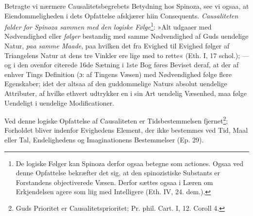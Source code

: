\documentclass[12pt,a4paper]{book}
\begin{document}
Betragte vi nærmere Causalitetsbegrebets Betydning hos Spinoza, see vi
ogsaa, at Eiendommeligheden i dets Opfattelse afskjærer hiin
Consequents. \emph{Causaliteten falder for Spinoza sammen med den
logiske Følge}\footnote{De logiske Følger kan Spinoza derfor ogsaa
betegne som actiones. Ogsaa ved denne Opfattelse bekræfter det sig, at
den spinozistiske Substants er Forstandens objectiverede Væsen.
Derfor sættes ogsaa i Læren om Erkjendelsen agere som liig med
Intelligere (Eth. IV, 24. dem.).}: »Alt udgaaer med Nødvendighed
eller \emph{følger} bestandig med samme Nødvendighed af Guds uendelige
Natur, \emph{paa samme Maade}, paa hvilken det fra Evighed til Evighed
følger af Triangelens Natur at dens tre Vinkler ere lige med to
rette« (Eth. I, 17 schol.); --- og i den ovenfor citerede 16de
Sætning i 1ste Bog føres Beviset deraf, at der af enhver Tings
Definition (ɔ: af Tingens Væsen) med Nødvendighed følge flere
Egenskaber; idet der altsaa af den guddommelige Naturs absolut
uendelige Attributer, af hvilke ethvert udtrykker en i sin Art
uendelig Væsenhed, maa følge Uendeligt i uendelige Modificationer.

Ved denne logiske Opfattelse af Causaliteten er Tidsbestemmelsen
fjernet\footnote{Guds Prioritet er Causalitetsprioritet; Pr. phil.
Cart. I, 12. Coroll 4.}; Forholdet bliver indenfor Evighedens Element,
der ikke bestemmes ved Tid, Maal eller Tal, Endelighedens og
Imaginationens Bestemmelser (Ep. 29).
\end{document}
